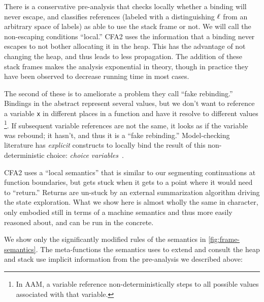 %
There is a conservative pre-analysis that checks locally whether a binding will never escape, and classifies references (labeled with a distinguishing $\ell$ from an arbitrary space of labels) as able to use the stack frame or not.
%
We will call the non-escaping conditions ``local.''
%
%
CFA2 uses the information that a binding never escapes to not bother allocating it in the heap.
%
This has the advantage of not changing the heap, and thus leads to less propagation.
%
The addition of these stack frames makes the analysis exponential in theory, though in practice they have been observed to decrease running time in most cases.

The second of these is to ameliorate a problem they call ``fake rebinding.''
%
Bindings in the abstract represent several values, but we don't want to reference a variable \texttt{x} in different places in a function and have it resolve to different values
\footnote{In AAM, a variable reference non-deterministically steps to all possible values associated with that variable.}.
%
If subsequent variable references are not the same, it looks as if the variable was rebound; it hasn't, and thus it is a ``fake rebinding.''
%
Model-checking literature has \emph{explicit} constructs to locally bind the result of this non-deterministic choice: \emph{choice variables}~\citep{ianjohnson:DBLP:conf/spin/CookKS05, ianjohnson:DBLP:journals/cacm/DilligDA10}.
%
%

CFA2 uses a ``local semantics'' that is similar to our segmenting continuations at function boundaries, but gets stuck when it gets to a point where it would need to ``return.''
%
Returns are un-stuck by an external summarization algorithm driving the state exploration.
%
What we show here is almost wholly the same in character, only embodied still in terms of a machine semantics and thus more easily reasoned about, and can be run in the concrete.

We show only the significantly modified rules of the semantics in \autoref{fig:frame-semantics}.
%
%
The meta-functions the semantics uses to extend and consult the heap and stack use implicit information from the pre-analysis we described above:

